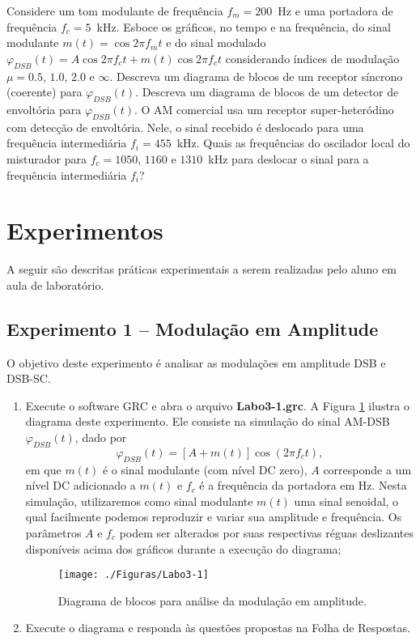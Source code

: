 \documentclass[12pt,addpoints]{exam}
\newcommand{\myscale}{0.4}
\begin{document}
\begin{questions}
  \question Considere um tom modulante de frequência $f_{m} = 200$~Hz e uma portadora de frequência $f_{c} = 5$~kHz. Esboce os gráficos, no tempo e na frequência, do sinal modulante $m(t) = \cos{2\pi f_{m}t}$ e do sinal modulado $\varphi_{DSB}(t) = A\cos{2\pi f_{c}t} + m(t)\cos{2\pi f_{c}t}$ considerando índices de modulação $\mu = 0.5$, $1.0$, $2.0$ e $\infty$. %
  \question Descreva um diagrama de blocos de um receptor síncrono (coerente) para $\varphi_{DSB}(t)$.
  \question Descreva um diagrama de blocos de um detector de envoltória para $\varphi_{DSB}(t)$.
  \question O AM comercial usa um receptor super-heteródino com detecção de envoltória. Nele, o sinal recebido é deslocado para uma frequência intermediária $f_{i} = 455$~kHz. Quais as frequências do oscilador local do misturador para $f_{c} = 1050$, $1160$ e $1310$~kHz para deslocar o sinal para a frequência intermediária $f_i$?
\end{questions}

\section{Experimentos}

A seguir são descritas práticas experimentais a serem realizadas pelo aluno em aula de laboratório. 

\subsection{Experimento 1 -- Modulação em Amplitude}

O objetivo deste experimento é analisar as modulações em amplitude DSB e DSB-SC.

\begin{enumerate}   
    \item Execute o software GRC e abra o arquivo \textbf{Labo3-1.grc}. A Figura \ref{fig:GRC_3-1} ilustra o diagrama deste experimento. Ele consiste na simulação do sinal AM-DSB $\varphi_{DSB}(t)$, dado por 
\begin{equation} \label{eq:am}
    \varphi_{DSB}(t) = [A + m(t)]\cos(2\pi f_{c}t),
\end{equation}
em que $m(t)$ é o sinal modulante (com nível DC zero), $A$ corresponde a um nível DC adicionado a $m(t)$ e $f_c$ é a frequência da portadora em Hz. Nesta simulação, utilizaremos como sinal modulante $m(t)$ uma sinal senoidal, o qual facilmente podemos reproduzir e variar sua amplitude e frequência. Os parâmetros $A$ e $f_c$ podem ser alterados por suas respectivas réguas deslizantes disponíveis acima dos gráficos durante a execução do diagrama;
    \begin{figure}[htb]
        \centering
        \texttt{[image: ./Figuras/Labo3-1]}
        \caption{Diagrama de blocos para análise da modulação em amplitude.} 
        \label{fig:GRC_3-1}
    \end{figure}
  \item Execute o diagrama e responda às questões propostas na Folha de Respostas.
\end{enumerate}
\end{document}
